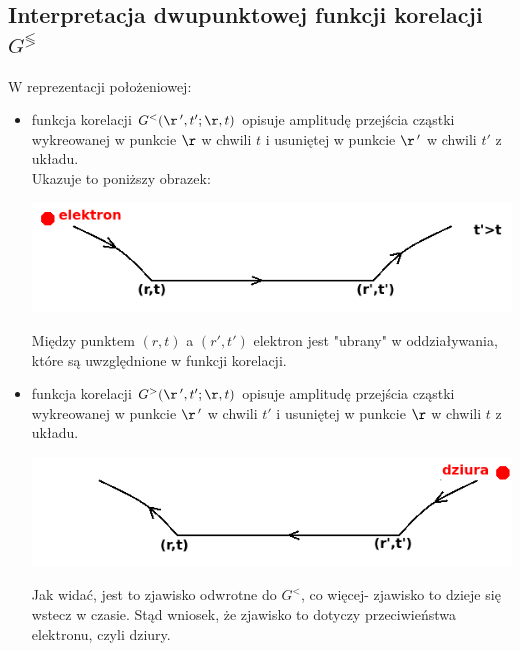 \subsection{Interpretacja dwupunktowej funkcji korelacji $G^{\lessgtr}$}
W reprezentacji położeniowej:
\begin{itemize}
\item funkcja korelacji $G^<(\r\,',t';\r,t)$ opisuje amplitudę przejścia cząstki wykreowanej w punkcie $\r$ w chwili $t$ i usuniętej w punkcie $\r\,'$ w chwili $t'$ z układu.\\
Ukazuje to poniższy obrazek:
\begin{center}
\includegraphics[scale=0.5]{obrazki/wykl_13_obrazek4.png}
\end{center}
Między punktem $(r,t)$ a $(r',t')$ elektron jest "ubrany" w oddziaływania, które są uwzględnione w funkcji korelacji.
\item funkcja korelacji $G^>(\r\,',t';\r,t)$ opisuje amplitudę przejścia cząstki wykreowanej w punkcie $\r\,'$ w chwili $t'$ i usuniętej w punkcie $\r$ w chwili $t$ z układu.\\
\begin{center}
\includegraphics[scale=0.5]{obrazki/wykl_13_obrazek5.png}
\end{center}
Jak widać, jest to zjawisko odwrotne do $G^<$, co więcej- zjawisko to dzieje się wstecz w czasie. Stąd wniosek, że zjawisko to dotyczy przeciwieństwa elektronu, czyli dziury.
\end{itemize}
